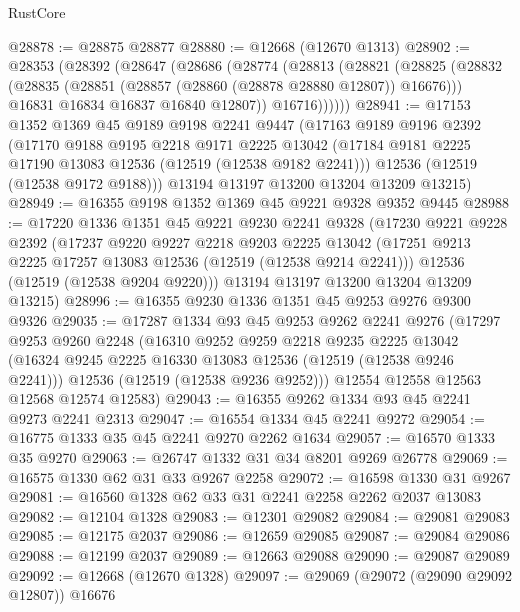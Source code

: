\begin{lexlean}{RustCore}
\begin{coremodule}
@28878 := @28875 @28877
@28880 := @12668 (@12670 @1313)
@28902 := @28353
    (@28392
      (@28647
        (@28686
          (@28774
            (@28813
              (@28821
                (@28825
                  (@28832
                    (@28835 (@28851 (@28857 (@28860 (@28878 @28880 @12807)) @16676)))
                    @16831
                    @16834
                    @16837
                    @16840
                    @12807))
                @16716))))))
@28941 := @17153
    @1352
    @1369
    @45
    @9189
    @9198
    @2241
    @9447
    (@17163
      @9189
      @9196
      @2392
      (@17170
        @9188
        @9195
        @2218
        @9171
        @2225
        @13042
        (@17184 @9181 @2225 @17190 @13083 @12536 (@12519 (@12538 @9182 @2241)))
        @12536
        (@12519 (@12538 @9172 @9188)))
      @13194
      @13197
      @13200
      @13204
      @13209
      @13215)
@28949 := @16355 @9198 @1352 @1369 @45 @9221 @9328 @9352 @9445
@28988 := @17220
    @1336
    @1351
    @45
    @9221
    @9230
    @2241
    @9328
    (@17230
      @9221
      @9228
      @2392
      (@17237
        @9220
        @9227
        @2218
        @9203
        @2225
        @13042
        (@17251 @9213 @2225 @17257 @13083 @12536 (@12519 (@12538 @9214 @2241)))
        @12536
        (@12519 (@12538 @9204 @9220)))
      @13194
      @13197
      @13200
      @13204
      @13209
      @13215)
@28996 := @16355 @9230 @1336 @1351 @45 @9253 @9276 @9300 @9326
@29035 := @17287
    @1334
    @93
    @45
    @9253
    @9262
    @2241
    @9276
    (@17297
      @9253
      @9260
      @2248
      (@16310
        @9252
        @9259
        @2218
        @9235
        @2225
        @13042
        (@16324 @9245 @2225 @16330 @13083 @12536 (@12519 (@12538 @9246 @2241)))
        @12536
        (@12519 (@12538 @9236 @9252)))
      @12554
      @12558
      @12563
      @12568
      @12574
      @12583)
@29043 := @16355 @9262 @1334 @93 @45 @2241 @9273 @2241 @2313
@29047 := @16554 @1334 @45 @2241 @9272
@29054 := @16775 @1333 @35 @45 @2241 @9270 @2262 @1634
@29057 := @16570 @1333 @35 @9270
@29063 := @26747 @1332 @31 @34 @8201 @9269 @26778
@29069 := @16575 @1330 @62 @31 @33 @9267 @2258
@29072 := @16598 @1330 @31 @9267
@29081 := @16560 @1328 @62 @33 @31 @2241 @2258 @2262 @2037 @13083
@29082 := @12104 @1328
@29083 := @12301 @29082
@29084 := @29081 @29083
@29085 := @12175 @2037
@29086 := @12659 @29085
@29087 := @29084 @29086
@29088 := @12199 @2037
@29089 := @12663 @29088
@29090 := @29087 @29089
@29092 := @12668 (@12670 @1328)
@29097 := @29069 (@29072 (@29090 @29092 @12807)) @16676

\end{coremodule}
\end{lexlean}
